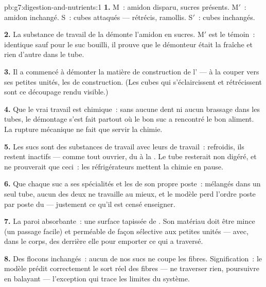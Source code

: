 \begin{solution}{pb:g7:digestion-and-nutrients:1}
\textbf{1.} M~: amidon disparu, sucres présents. M$'$~: amidon
inchangé. S~: cubes attaqués --- rétrécis, ramollis. S$'$~: cubes
inchangés.

\textbf{2.} La substance de travail de la  démonte l'amidon en
sucres. M$'$ est le témoin~: identique sauf pour le suc bouilli, il
prouve que le démonteur était la  fraîche et rien d'autre dans
le tube.

\textbf{3.} Il a commencé à démonter la matière de construction de
l' --- à la couper vers ses petites unités, les  de
construction. (Les cubes qui s'éclaircissent et rétrécissent sont ce
découpage rendu visible.)

\textbf{4.} Que le vrai travail est chimique~: sans aucune dent ni
aucun brassage dans les tubes, le démontage s'est fait partout où le
bon suc a rencontré le bon aliment. La rupture mécanique ne fait que
servir la chimie.

\textbf{5.} Les sucs sont des substances de travail avec leurs
 de travail~: refroidis, ils restent inactifs --- comme
tout ouvrier, du  à la . Le tube resterait non
digéré, et ne prouverait que ceci~: les réfrigérateurs mettent la
chimie en pause.

\textbf{6.} Que chaque suc a ses spécialités et les  de
son propre poste~: mélangés dans un seul tube, aucun des deux ne
travaille au mieux, et le modèle perd l'ordre poste par poste du
 --- justement ce qu'il est censé enseigner.

\textbf{7.} La paroi absorbante~: une surface tapissée de
. Son matériau doit être mince (un passage facile) et
perméable de façon sélective aux petites unités --- avec, dans le
corps, des  derrière elle pour emporter ce qui a
traversé.

\textbf{8.} Des flocons inchangés~: aucun de nos sucs ne coupe les
fibres. Signification~: le modèle prédit correctement le sort réel
des fibres --- ne traverser rien, poursuivre en balayant ---
l'exception qui trace les limites du système.


\end{solution}
